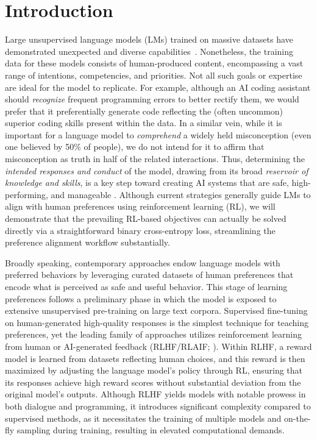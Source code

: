 \section{Introduction}
Large unsupervised language models (LMs) trained on massive datasets have demonstrated unexpected and diverse capabilities~\citep{chowdhery2022palm, brown2020language, touvron2023llama,bubeck2023sparks}. Nonetheless, the training data for these models consists of human-produced content, encompassing a vast range of intentions, competencies, and priorities. Not all such goals or expertise are ideal for the model to replicate. For example, although an AI coding assistant should \textit{recognize} frequent programming errors to better rectify them, we would prefer that it preferentially generate code reflecting the (often uncommon) superior coding skills present within the data. In a similar vein, while it is important for a language model to \textit{comprehend} a widely held misconception (even one believed by 50\% of people), we do not intend for it to affirm that misconception as truth in half of the related interactions. Thus, determining the \emph{intended responses and conduct} of the model, drawing from its broad \textit{reservoir of knowledge and skills}, is a key step toward creating AI systems that are safe, high-performing, and manageable \citep{ouyang2022training}. Although current strategies generally guide LMs to align with human preferences using reinforcement learning (RL), we will demonstrate that the prevailing RL-based objectives can actually be solved directly via a straightforward binary cross-entropy loss, streamlining the preference alignment workflow substantially.

Broadly speaking, contemporary approaches endow language models with preferred behaviors by leveraging curated datasets of human preferences that encode what is perceived as safe and useful behavior. This stage of learning preferences follows a preliminary phase in which the model is exposed to extensive unsupervised pre-training on large text corpora. Supervised fine-tuning on human-generated high-quality responses is the simplest technique for teaching preferences, yet the leading family of approaches utilizes reinforcement learning from human or AI-generated feedback (RLHF/RLAIF; \citep{christiano2017deep,bai2022constitutional}). Within RLHF, a reward model is learned from datasets reflecting human choices, and this reward is then maximized by adjusting the language model's policy through RL, ensuring that its responses achieve high reward scores without substantial deviation from the original model's outputs. Although RLHF yields models with notable prowess in both dialogue and programming, it introduces significant complexity compared to supervised methods, as it necessitates the training of multiple models and on-the-fly sampling during training, resulting in elevated computational demands.

